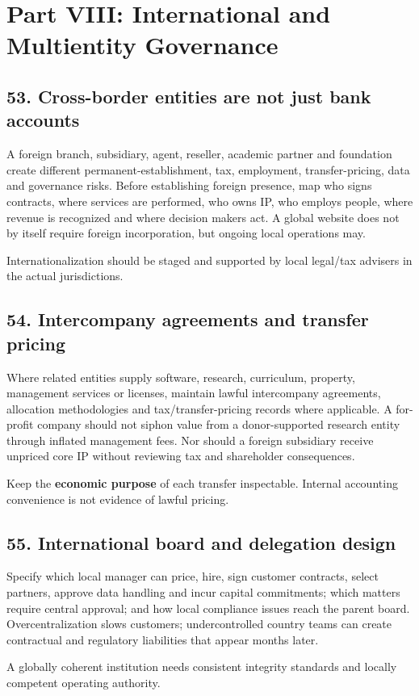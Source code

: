 \section*{Part VIII: International and Multientity Governance}

\subsection{53. Cross-border entities are not just bank accounts}

A foreign branch, subsidiary, agent, reseller, academic partner and foundation create different permanent-establishment, tax, employment, transfer-pricing, data and governance risks. Before establishing foreign presence, map who signs contracts, where services are performed, who owns IP, who employs people, where revenue is recognized and where decision makers act. A global website does not by itself require foreign incorporation, but ongoing local operations may.

Internationalization should be staged and supported by local legal/tax advisers in the actual jurisdictions.

\subsection{54. Intercompany agreements and transfer pricing}

Where related entities supply software, research, curriculum, property, management services or licenses, maintain lawful intercompany agreements, allocation methodologies and tax/transfer-pricing records where applicable. A for-profit company should not siphon value from a donor-supported research entity through inflated management fees. Nor should a foreign subsidiary receive unpriced core IP without reviewing tax and shareholder consequences.

Keep the \textbf{economic purpose} of each transfer inspectable. Internal accounting convenience is not evidence of lawful pricing.

\subsection{55. International board and delegation design}

Specify which local manager can price, hire, sign customer contracts, select partners, approve data handling and incur capital commitments; which matters require central approval; and how local compliance issues reach the parent board. Overcentralization slows customers; undercontrolled country teams can create contractual and regulatory liabilities that appear months later.

A globally coherent institution needs consistent integrity standards and locally competent operating authority.
